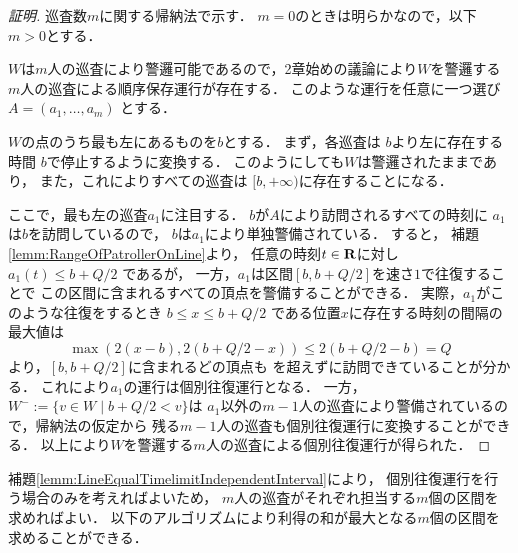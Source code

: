 \begin{proof}[証明]

  \newcommand{\leftmostpoint}{b}  %
  \newcommand{\newpatroller}{l}
  \newcommand{\leftmostpatroller}{a_1}

  巡査数$m$に関する帰納法で示す．
  $m = 0$のときは明らかなので，以下$m > 0$とする．

  $W$は$m$人の巡査により警邏可能であるので，2章始めの議論により$W$を警邏する$m$人の巡査による順序保存運行が存在する．
  このような運行を任意に一つ選び
  $A = (a _1, \ldots, a _m)$
  とする．

  $W$の点のうち最も左にあるものを$\leftmostpoint$とする．
  まず，各巡査は
  $\leftmostpoint$より左に存在する時間
  $\leftmostpoint$で停止するように変換する．
  このようにしても$W$は警邏されたままであり，
  また，これによりすべての巡査は
  $[\leftmostpoint, +\infty)$に存在することになる．

  ここで，最も左の巡査$\leftmostpatroller$に注目する．
  $\leftmostpoint$が$A$により訪問されるすべての時刻に
  $\leftmostpatroller$は$\leftmostpoint$を訪問しているので，
  $\leftmostpoint$は$\leftmostpatroller$により単独警備されている．
  すると，
  補題\ref{lemm:RangeOfPatrollerOnLine}より，
  任意の時刻$t \in \mathbf R$に対し
  $\leftmostpatroller(t) \leq \leftmostpoint + Q/2$
  であるが，
  一方，$\leftmostpatroller$は区間$[b, b + Q/2]$を速さ$1$で往復することで
  この区間に含まれるすべての頂点を警備することができる．
  実際，$\leftmostpatroller$がこのような往復をするとき
  $\leftmostpoint \leq x \leq \leftmostpoint + Q/2$
  である位置$x$に存在する時刻の間隔の最大値は
  \[
    \max( 2(x - \leftmostpoint), 2(\leftmostpoint + Q/2 - x) )
    \leq 2(\leftmostpoint + Q/2 - \leftmostpoint) = Q
  \]
  より，$[\leftmostpoint, \leftmostpoint + Q/2]$に含まれるどの頂点も
  {\idletime}を超えずに訪問できていることが分かる．
  これにより$\leftmostpatroller$の運行は個別往復運行となる．
  一方，$W^- := \{ v \in W \mid \leftmostpoint + Q/2 < v \}$は
  $\leftmostpatroller$以外の$m - 1$人の巡査により警備されているので，帰納法の仮定から
  残る$m - 1$人の巡査も個別往復運行に変換することができる．
  以上により$W$を警邏する$m$人の巡査による個別往復運行が得られた．
\end{proof}


補題\ref{lemm:LineEqualTimelimitIndependentInterval}により，
個別往復運行を行う場合のみを考えればよいため，
$m$人の巡査がそれぞれ担当する$m$個の区間を求めればよい．
以下のアルゴリズムにより利得の和が最大となる$m$個の区間を求めることができる．

